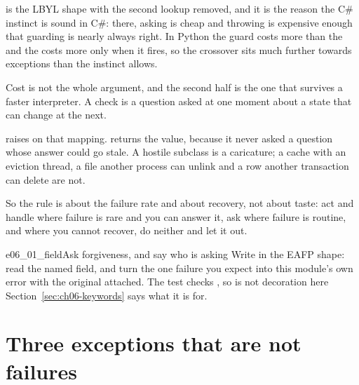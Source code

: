 \begin{csbox}
 is the LBYL shape with the second lookup removed, and it
is the reason the C\# instinct is sound in C\#: there, asking is cheap and
throwing is expensive enough that guarding is nearly always right. In Python
the guard costs more than the  and the  costs more only
when it fires, so the crossover sits much further towards exceptions than
the instinct allows.
\end{csbox}

\noindent
Cost is not the whole argument, and the second half is the one that survives
a faster interpreter. A check is a question asked at one moment about a state
that can change at the next.


\noindent
{} raises  on that mapping. 
returns the value, because it never asked a question whose answer could go
stale. A hostile  subclass is a caricature; a cache with an
eviction thread, a file another process can unlink and a row another
transaction can delete are not.

So the rule is about the failure rate and about recovery, not about taste:
act and handle where failure is rare and you can answer it, ask where failure
is routine, and where you cannot recover, do neither and let it out.


\begin{exercise}{e06_01_field}{Ask forgiveness, and say who is asking}
Write  in the EAFP shape: read the named field, and turn the
one failure you expect into this module's own error with the original
attached. The test checks , so  is
not decoration here \dash{} Section~\ref{sec:ch06-keywords} says what it is
for.
\end{exercise}

\section{Three exceptions that are not failures}
\label{sec:ch06-protocol}

